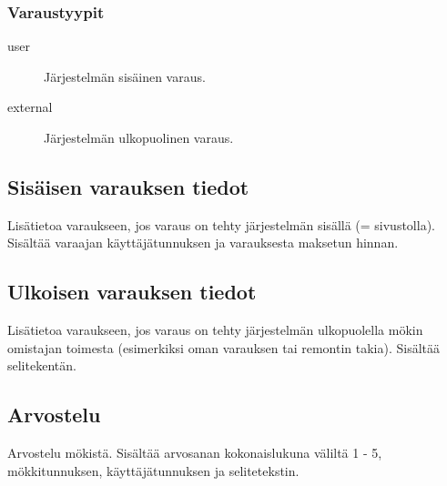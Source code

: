 \subsubsection*{Varaustyypit}
\begin{description}
	\item[user] Järjestelmän sisäinen varaus.
	\item[external] Järjestelmän ulkopuolinen varaus.
\end{description}

\subsection{Sisäisen varauksen tiedot}
Lisätietoa varaukseen, jos varaus on tehty järjestelmän sisällä (= sivustolla). Sisältää varaajan käyttäjätunnuksen ja varauksesta maksetun hinnan.

\subsection{Ulkoisen varauksen tiedot}
Lisätietoa varaukseen, jos varaus on tehty järjestelmän ulkopuolella mökin omistajan toimesta (esimerkiksi oman varauksen tai remontin takia). Sisältää selitekentän.

\subsection{Arvostelu}
Arvostelu mökistä. Sisältää arvosanan kokonaislukuna väliltä 1 - 5, mökkitunnuksen, käyttäjätunnuksen ja selitetekstin.